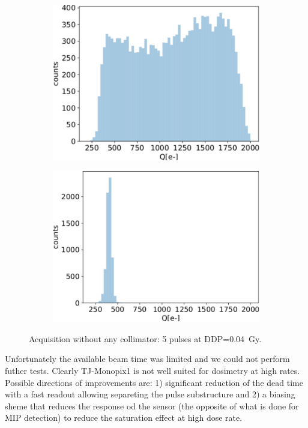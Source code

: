    \begin{figure}
      \begin{subfigure}[b]{0.49\textwidth}
         \centering
         \includegraphics[width=\linewidth]{figures/test_beam/Qe_17_32.pdf}  
         \caption{}
         \label{fig:aa1}
     \end{subfigure}
     \hfill
     \begin{subfigure}[b]{0.49\textwidth}
         \centering
         \includegraphics[width=\linewidth]{figures/test_beam/noise_Qe_17_32.pdf}
         \caption{}
         \label{fig:aa2}
     \end{subfigure}
      \caption{Acquisition without any collimator: 5 pulses at DDP=\SI{0.04}{Gy}.}
      \label{fig:without_collimator}
  \end{figure}

   Unfortunately the available beam time was limited and we could not perform futher tests. Clearly TJ-Monopix1 is not well suited for dosimetry at high rates. Possible directions of improvements are: 1) significant reduction of the dead time with a fast readout allowing separeting the pulse substructure and 2) a biasing sheme that reduces the response od the sensor (the opposite of what is done for MIP detection) to reduce the saturation effect at high dose rate. 



   